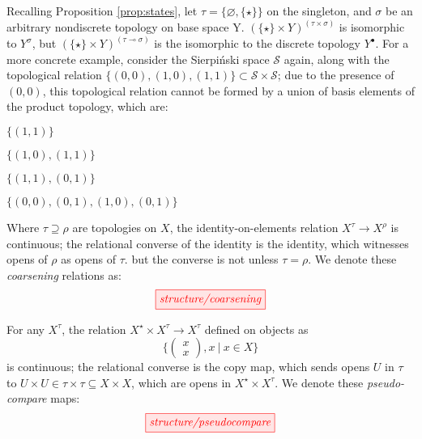 {\begin{example}[$\tau \multimap \sigma \nsubseteq \tau \times \sigma$]
Recalling Proposition \ref{prop:states}, let $\tau = \{\varnothing,\{\star\}\}$ on the singleton, and $\sigma$ be an arbitrary nondiscrete topology on base space Y. $(\{\star\} \times Y)^{(\tau \times \sigma)}$ is isomorphic to $Y^\sigma$, but $(\{\star\} \times Y)^{(\tau \multimap \sigma)}$ is the isomorphic to the discrete topology $Y^\bullet$. For a more concrete example, consider the Sierpi\'{n}ski space $\mathcal{S}$ again, along with the topological relation $\{(0,0),(1,0),(1,1)\} \subset \mathcal{S} \times \mathcal{S}$; due to the presence of $(0,0)$, this topological relation cannot be formed by a union of basis elements of the product topology, which are:
\begin{description}
\centering
\item[$\{1\} \times \{1\}$ =] $\{(1,1)\}$
\item[$\{1\} \times \{0,1\}$ =] $\{ (1,0),(1,1) \}$
\item[$\{0,1\} \times \{1\}$ =] $\{ (1,1),(0,1) \}$
\item[$\{0,1\} \times \{0,1\}$ =] $\{ (0,0), (0,1), (1,0), (0,1) \}$
\end{description}
\end{example}

\begin{defn}[Coarsening]\label{defn:coarsening}
Where $\tau \supseteq \rho$ are topologies on $X$, the identity-on-elements relation $X^\tau \rightarrow X^\rho$ is continuous; the relational converse of the identity is the identity, which witnesses opens of $\rho$ as opens of $\tau$. but the converse is not unless $\tau = \rho$. We denote these \emph{coarsening} relations as:
\[\tikzfig{structure/coarsening}\]
\end{defn}

\begin{defn}\label{defn:compare}
For any $X^\tau$, the relation $X^\star \times X^\tau \rightarrow X^\tau$ defined on objects as \[\{ \begin{pmatrix} x \\ x \end{pmatrix}, x \ | \ x \in X\}\] is continuous; the relational converse is the copy map, which sends opens $U$ in $\tau$ to $U \times U \in \tau \times \tau \subseteq X \times X$, which are opens in $X^\star \times X^\tau$. We denote these \emph{pseudo-compare} maps:
\[\tikzfig{structure/pseudocompare}\]
\end{defn}

}
